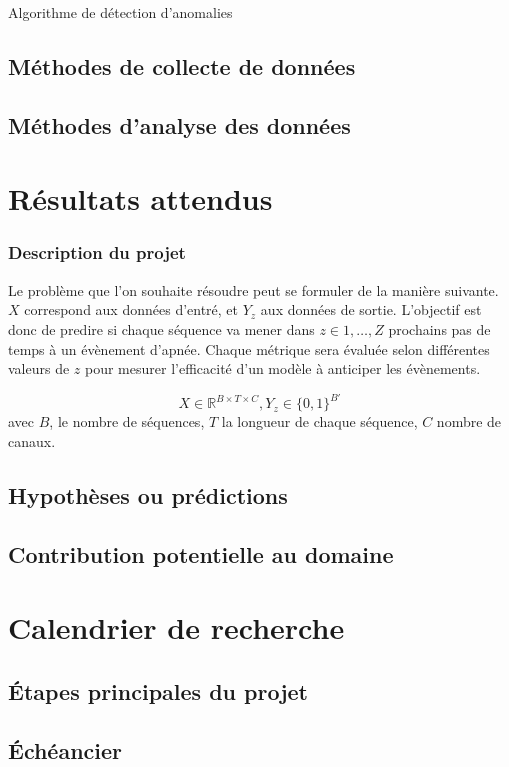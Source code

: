 \documentclass{article}
\begin{document}
    Algorithme de détection d’anomalies

    \subsection{Méthodes de collecte de données}
    \subsection{Méthodes d'analyse des données}

    \section{Résultats attendus}

    \subsubsection{Description du projet}

    Le problème que l'on souhaite résoudre peut se formuler de la manière suivante. $X$ correspond aux données d'entré, et $Y_z$ aux données de sortie. L'objectif est donc de predire si chaque séquence va mener dans $z \in {1, \dots, Z}$ prochains pas de temps à un évènement d'apnée. Chaque métrique sera évaluée selon différentes valeurs de $z$ pour mesurer l'efficacité d'un modèle à anticiper les évènements.

    $$ X \in \mathbb{R}^{B \times T \times C}, Y_z \in \{0, 1\}^{B'} $$
    avec $B$, le nombre de séquences, $T$ la longueur de chaque séquence, $C$ nombre de canaux.


    \subsection{Hypothèses ou prédictions}
    \subsection{Contribution potentielle au domaine}

    \section{Calendrier de recherche}
    \subsection{Étapes principales du projet}
    \subsection{Échéancier}
\end{document}
